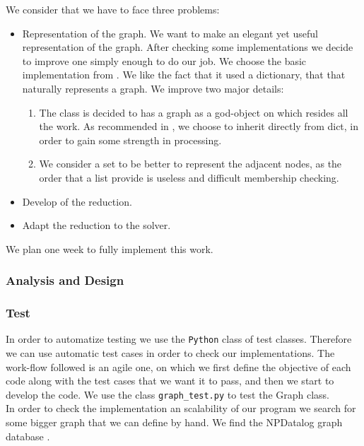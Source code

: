 We consider that we have to face three problems:
\begin{itemize}
\item Representation of the graph. We want to make an elegant yet useful representation of the graph. After checking some implementations we decide to improve one simply enough to do our job. We choose the basic implementation from \cite{graphAdvanced}. We like the fact that it used a dictionary, that that naturally represents a graph. We improve two major details:
  \begin{enumerate}
  \item The class is decided to has a graph as a god-object on which resides all the work. As recommended in \cite{slatkin2019effective}, we choose to inherit directly from dict, in order to gain some strength in processing.
  \item We consider a set to be better to represent the adjacent nodes, as the order that a list provide is useless and difficult membership checking.
  \end{enumerate}

\item Develop of the reduction.
\item Adapt the reduction to the solver.

\end{itemize}


We plan one week to fully implement this work. 

\subsubsection{Analysis and Design}






\subsubsection{Test}

In order to automatize testing we use the \texttt{Python} class of test classes. Therefore we can use automatic test cases in order to check our implementations. The work-flow followed is an agile one, on which we first define the objective of each code along with the test cases that we want it to pass, and then we start to develop the code. 
We use the class \texttt{graph\_test.py} to test the Graph class. \\

In order to check the implementation an scalability of our program we search for some bigger graph that we can define by hand. We find the NPDatalog graph database \cite{NPDatalog}.